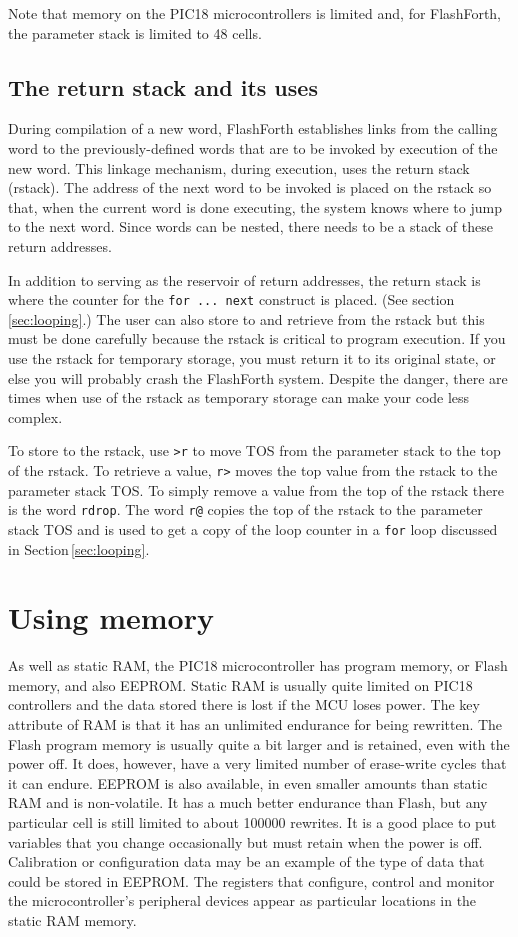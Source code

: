 \documentclass[12pt,a4paper]{article}
\begin{document}
\medskip
Note that memory on the PIC18 microcontrollers is limited and,
for FlashForth, the parameter stack is limited to 48 cells.

\medskip
\subsection{The return stack and its uses}
\label{sec:return-stack}
%
During compilation of a new word, FlashForth establishes links from the calling word
to the previously-defined words that are to be invoked by execution of the new word.
This linkage mechanism, during execution, uses the return stack (rstack).
The address of the next word to be invoked is placed on the rstack so that,
when the current word is done executing, the system knows where to jump 
to the next word.
Since words can be nested, there needs to be a stack of these return addresses.

\medskip
In addition to serving as the reservoir of return addresses, 
the return stack is where the counter for the \verb!for ... next! construct is placed.
(See section\,\ref{sec:looping}.)
The user can also store to and retrieve from the rstack but this must be done carefully
because the rstack is critical to program execution.
If you use the rstack for temporary storage, you must return it to its original state,
or else you will probably crash the FlashForth system.
Despite the danger, there are times when use of the rstack as temporary storage can make
your code less complex.

\medskip
To store to the rstack, use \verb!>r! to move TOS from the parameter stack 
to the top of the rstack.
To retrieve a value, \verb!r>! moves the top value from the rstack 
to the parameter stack TOS.
To simply remove a value from the top of the rstack there is the word \verb!rdrop!.
The word \verb!r@! copies the top of the rstack to the parameter stack TOS 
and is used to get a copy of the loop counter in a \verb!for! loop 
discussed in Section\,\ref{sec:looping}. 


\bigskip
\section{Using memory}
\label{sec:memory}
%
As well as static RAM, the PIC18 microcontroller has program memory, or Flash memory,
and also EEPROM.
Static RAM is usually quite limited on PIC18 controllers and the data stored there is
lost if the MCU loses power.
The key attribute of RAM is that it has an unlimited endurance for being rewritten.
The Flash program memory is usually quite a bit larger and is retained, even with the power off.
It does, however, have a very limited number of erase-write cycles that it can endure.
EEPROM is also available, in even smaller amounts than static RAM and is non-volatile.
It has a much better endurance than Flash, but any particular cell 
is still limited to about 100000 rewrites.
It is a good place to put variables that you change occasionally but must retain when the power is off.
Calibration or configuration data may be an example of the type of data 
that could be stored in EEPROM.
The registers that configure, control and monitor the microcontroller's peripheral devices 
appear as particular locations in the static RAM memory.
\end{document}
